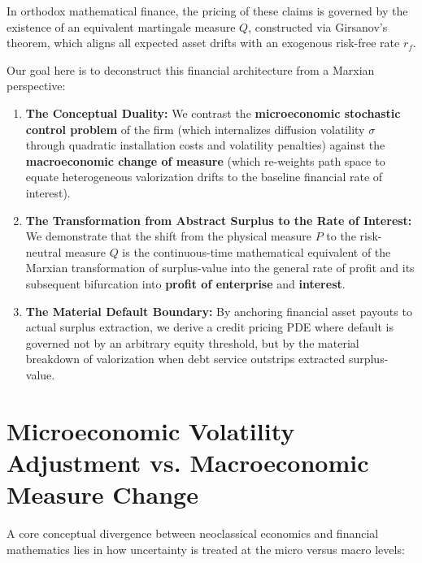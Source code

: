 \documentclass[11pt,letterpaper]{report}
\begin{document}
In orthodox mathematical finance, the pricing of these claims is governed by the existence of an equivalent martingale measure $Q$, constructed via Girsanov's theorem, which aligns all expected asset drifts with an exogenous risk-free rate ${r}_{f}$.

Our goal here is to deconstruct this financial architecture from a Marxian perspective:

\begin{enumerate}
\item \textbf{The Conceptual Duality:} We contrast the \textbf{microeconomic stochastic control problem} of the firm (which internalizes diffusion volatility $\sigma$ through quadratic installation costs and volatility penalties) against the \textbf{macroeconomic change of measure} (which re-weights path space to equate heterogeneous valorization drifts to the baseline financial rate of interest).
\item \textbf{The Transformation from Abstract Surplus to the Rate of Interest:} We demonstrate that the shift from the physical measure $P$ to the risk-neutral measure $Q$ is the continuous-time mathematical equivalent of the Marxian transformation of surplus-value into the general rate of profit and its subsequent bifurcation into \textbf{profit of enterprise} and \textbf{interest}.
\item \textbf{The Material Default Boundary:} By anchoring financial asset payouts to actual surplus extraction, we derive a credit pricing PDE where default is governed not by an arbitrary equity threshold, but by the material breakdown of valorization when debt service outstrips extracted surplus-value.
\end{enumerate}
\section{Microeconomic Volatility Adjustment vs. Macroeconomic Measure Change}
A core conceptual divergence between neoclassical economics and financial mathematics lies in how uncertainty is treated at the micro versus macro levels:
\end{document}
